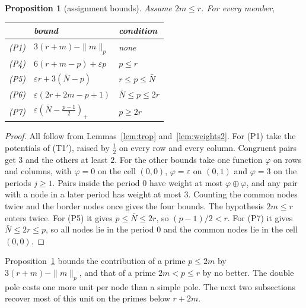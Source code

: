 \documentclass[11pt]{amsart}
\newtheorem{proposition}[theorem]{Proposition}
\theoremstyle{definition}
\theoremstyle{remark}
\numberwithin{equation}{section}
\begin{document}
\begin{proposition}[assignment bounds]\label{prop:rows2}
Assume $2m\le r$. For every member,
\begin{center}
{\renewcommand{\arraystretch}{1.2}
\begin{tabular}{@{}lll@{}}
\toprule
 & bound & condition\\
\midrule
(P1) & $3(r+m)-\|m\|_p$ & none\\
(P4) & $6(r+m-p)+\varepsilon p$ & $p\le r$\\
(P5) & $\varepsilon r+3(\bar N-p)$ & $r\le p\le\bar N$\\
(P6) & $\varepsilon(2r+2m-p+1)$ & $\bar N\le p\le2r$\\
(P7) & $\varepsilon(\bar N-\frac{p-1}2)_+$ & $p\ge2r$\\
\bottomrule
\end{tabular}}
\end{center}
\end{proposition}
\begin{proof}
All follow from Lemmas~\ref{lem:trop} and~\ref{lem:weights2}. For (P1) take the potentials of (T1$'$), raised by
$\frac12$ on every row and every column. Congruent pairs get $3$ and the others at least $2$. For the other bounds take
one function $\varphi$ on rows and columns, with $\varphi=0$ on the cell $(0,0)$, $\varphi=\varepsilon$ on $(0,1)$ and $\varphi=3$ on the periods
$j\ge1$. Pairs inside the period $0$ have weight at most $\varphi\oplus\varphi$, and any pair with a node in a later period has
weight at most $3$. Counting the common nodes twice and the border nodes once gives the four bounds. The hypothesis
$2m\le r$ enters twice. For (P5) it gives $p\le\bar N\le2r$, so $(p-1)/2<r$. For (P7) it gives $\bar N\le2r\le p$, so all
nodes lie in the period $0$ and the common nodes lie in the cell $(0,0)$.
\end{proof}

Proposition~\ref{prop:rows2} bounds the contribution of a prime $p\le2m$ by $3(r+m)-\|m\|_p$, and that of a prime
$2m<p\le r$ by no better. The double
pole costs one more unit per node than a simple pole. The next two subsections recover most of this unit on the primes
below $r+2m$.
\end{document}
